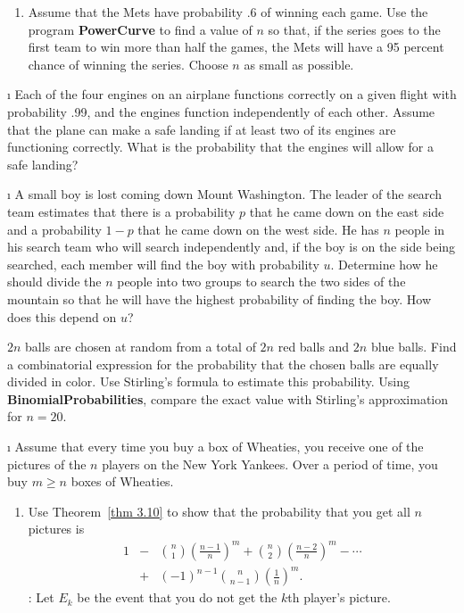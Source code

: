 \begin{LJSItem}
\begin{enumerate}
\item Assume that the Mets have probability .6 of winning each game.  Use the program
{\bf PowerCurve} to find a value of $n$ so that, if the series goes to the first team to
win more than half the games, the Mets will have a 95 percent chance of winning the
series.  Choose $n$ as small as possible.
\end{enumerate}

\i\label{exer 3.2.31} Each of the four engines on an airplane functions correctly
on a given flight with probability .99, and the engines function independently of each
other.  Assume that the plane can make a safe landing if at least two of its engines
are functioning correctly.  What is the probability that the engines will allow for a
safe landing?

\i\label{exer 3.2.32} A small boy is lost coming down Mount Washington.  The leader
of the search team estimates that there is a probability $p$ that he came down on the
east side and a probability $1 - p$ that he came down on the west side.  He has
$n$ people in his search team who will search independently and, if the boy is on the
side being searched, each member will find the boy with probability
$u$.  Determine how he should divide the $n$ people into two groups to search the two
sides of the mountain so that he will have the highest probability of finding the
boy.  How does this depend on $u$?

\istar\label{exer 3.2.33} $2n$ balls are chosen at random from a total of $2n$ red
balls and $2n$ blue balls.  Find a combinatorial expression for the probability that
the chosen balls are equally divided in color.  Use Stirling's formula to estimate
this probability.  Using {\bf BinomialProbabilities}, compare the exact value with Stirling's
approximation for $n = 20$.

\i\label{exer 3.2.34} Assume that every time you buy a box of Wheaties, you receive
one of the pictures of the $n$ players on the New York Yankees.  Over a
period of time, you buy $m \geq n$ boxes of Wheaties.
\begin{enumerate}
\item Use Theorem~\ref{thm 3.10}  to show that the probability that you get all $n$
pictures is
\begin{eqnarray*}
   1 &-& {n \choose 1} \left(\frac{n - 1}n\right)^m + {n \choose 2} \left(\frac{n - 2}n\right)^m -
           \cdots  \\
     &+& (-1)^{n - 1} {n \choose {n - 1}}\left(\frac 1n \right)^m.
\end{eqnarray*}
: Let $E_k$ be the event that you do not get the $k$th player's
picture.


\end{enumerate}
\end{LJSItem}
